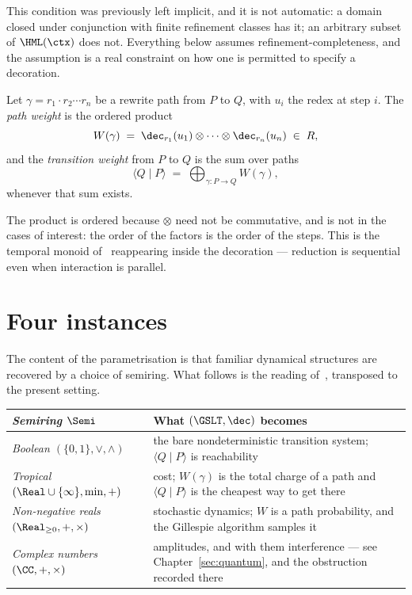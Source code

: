This condition was previously left implicit, and it is not automatic: a
domain closed under conjunction with finite refinement classes has it; an
arbitrary subset of $\HML(\ctx)$ does not.  Everything below assumes
refinement-completeness, and the assumption is a real constraint on how
one is permitted to specify a decoration.

\begin{definition}
\label{def:pathweight}
Let $\gamma = r_1 \cdot r_2 \cdots r_n$ be a rewrite path from $P$ to $Q$,
with $u_i$ the redex at step $i$.  The \emph{path weight} is the ordered
product
\[
  W(\gamma) \;=\; \dec_{r_1}(u_1) \otimes \cdots \otimes \dec_{r_n}(u_n)
  \;\in\; R,
\]
and the \emph{transition weight} from $P$ to $Q$ is the sum over paths
\[
  \langle Q \mid P \rangle \;=\; \bigoplus_{\gamma : P \to Q} W(\gamma),
\]
whenever that sum exists.
\end{definition}

The product is ordered because $\otimes$ need not be commutative, and is
not in the cases of interest: the order of the factors is the order of the
steps.  This is the temporal monoid of~\cite[\S4]{CE} reappearing inside
the decoration --- reduction is sequential even when interaction is
parallel.

\section{Four instances}

The content of the parametrisation is that familiar dynamical structures
are recovered by a choice of semiring.  What follows is the reading
of~\cite[\S13]{CE}, transposed to the present setting.

\begin{center}
\renewcommand{\arraystretch}{1.35}
\begin{tabular}{>{\itshape}p{4.3cm} p{7.4cm}}
\toprule
\normalfont\textbf{Semiring $\Semi$} & \textbf{What $(\GSLT,\dec)$ becomes} \\
\midrule
Boolean $(\{0,1\},\vee,\wedge)$
  & the bare nondeterministic transition system; $\langle Q\mid P\rangle$
    is reachability \\
Tropical $(\Real\cup\{\infty\},\min,+)$
  & cost; $W(\gamma)$ is the total charge of a path and
    $\langle Q\mid P\rangle$ is the cheapest way to get there \\
Non-negative reals $(\Real_{\geq 0},+,\times)$
  & stochastic dynamics; $W$ is a path probability, and the Gillespie
    algorithm samples it \\
Complex numbers $(\CC,+,\times)$
  & amplitudes, and with them interference --- see
    Chapter~\ref{sec:quantum}, and the obstruction recorded there \\
\bottomrule
\end{tabular}
\end{center}

